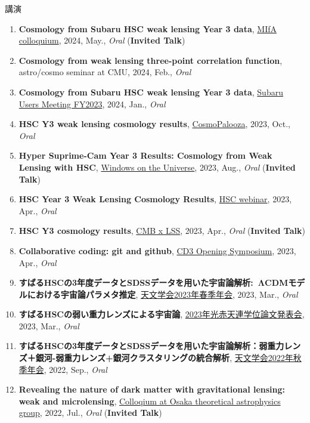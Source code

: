 \begin{rSection}{講演}
\begin{enumerate}
\item \textbf{Cosmology from Subaru HSC weak lensing Year 3 data}, \href{https://cse.umn.edu/physics/minnesota-institute-astrophysics-mifa-colloquium}{MIfA colloquium}, 2024, May., \textit{Oral} (\textbf{Invited Talk})
\item \textbf{Cosmology from weak lensing three-point correlation function}, astro/cosmo seminar at CMU, 2024, Feb., \textit{Oral}
\item \textbf{Cosmology from Subaru HSC weak lensing Year 3 data}, \href{https://www.subarutelescope.org/Science/SubaruUM/SubaruUM2023/index.html}{Subaru Users Meeting FY2023}, 2024, Jan., \textit{Oral}
\item \textbf{HSC Y3 weak lensing cosmology results}, \href{http://vietnam.in2p3.fr/2023/windows/index.html}{CosmoPalooza}, 2023, Oct., \textit{Oral}
\item \textbf{Hyper Suprime-Cam Year 3 Results: Cosmology from Weak Lensing with HSC}, \href{http://vietnam.in2p3.fr/2023/windows/index.html}{Windows on the Universe}, 2023, Aug., \textit{Oral} (\textbf{Invited Talk})
\item \textbf{HSC Year 3 Weak Lensing Cosmology Results}, \href{https://hsc-release.mtk.nao.ac.jp/doc/index.php/wly3/}{HSC webinar}, 2023, Apr., \textit{Oral}
\item \textbf{HSC Y3 cosmology results}, \href{https://www2.yukawa.kyoto-u.ac.jp/~cmb-lss/index.php}{CMB x LSS}, 2023, Apr., \textit{Oral} (\textbf{Invited Talk})
\item \textbf{Collaborative coding: git and github}, \href{https://cd3.ipmu.jp/opening/}{CD3 Opening Symposium}, 2023, Apr., \textit{Oral}
\item \textbf{すばるHSCの3年度データとSDSSデータを用いた宇宙論解析: ΛCDMモデルにおける宇宙論パラメタ推定}, \href{https://www.asj.or.jp/nenkai/archive/2023a/pdf/U20a.pdf}{天文学会2023年春季年会}, 2023, Mar., \textit{Oral}
\item \textbf{すばるHSCの弱い重力レンズによる宇宙論}, \href{http://gopira.jp/Dthesis2022/program.html}{2023年光赤天連学位論文発表会}, 2023, Mar., \textit{Oral}
\item \textbf{すばるHSCの3年度データとSDSSデータを用いた宇宙論解析：弱重力レンズ＋銀河-弱重力レンズ+銀河クラスタリングの統合解析}, \href{https://www.asj.or.jp/nenkai/archive/2022b/pdf/U15a.pdf}{天文学会2022年秋季年会}, 2022, Sep., \textit{Oral}
\item \textbf{Revealing the nature of dark matter with gravitational lensing: weak and microlensing}, \href{http://astro-osaka.jp/OUTAP/colloquium-abstracts.html#sugiyama}{Colloqium at Osaka theoretical astrophysics group}, 2022, Jul., \textit{Oral} (\textbf{Invited Talk})

\end{enumerate}
\end{rSection}

